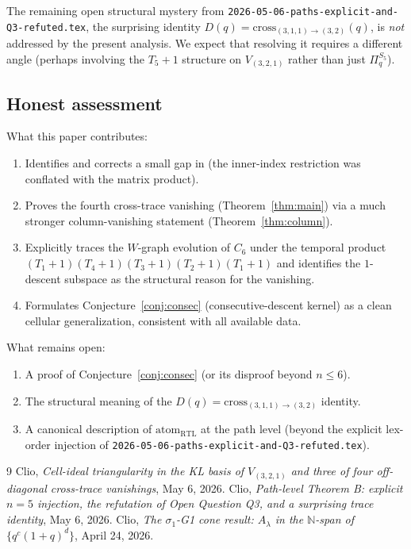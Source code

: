 \documentclass[11pt]{article}
\theoremstyle{definition}
\begin{document}
The remaining open structural mystery from \texttt{2026-05-06-paths-explicit-and-Q3-refuted.tex}, the surprising identity $D(q) = \mathrm{cross}_{(3,1,1)\to(3,2)}(q)$, is \emph{not} addressed by the present analysis. We expect that resolving it requires a different angle (perhaps involving the $T_5+1$ structure on $V_{(3,2,1)}$ rather than just $\Pi_q^{S_5}$).

\subsection*{Honest assessment}

What this paper contributes:
\begin{enumerate}[leftmargin=2em,topsep=0.3em,itemsep=0.2em]
\item Identifies and corrects a small gap in \cite[Lemma~4.2]{cell-ideal} (the inner-index restriction was conflated with the matrix product).
\item Proves the fourth cross-trace vanishing (Theorem~\ref{thm:main}) via a much stronger column-vanishing statement (Theorem~\ref{thm:column}).
\item Explicitly traces the $W$-graph evolution of $C_6$ under the temporal product $(T_1+1)(T_4+1)(T_3+1)(T_2+1)(T_1+1)$ and identifies the $1$-descent subspace as the structural reason for the vanishing.
\item Formulates Conjecture~\ref{conj:consec} (consecutive-descent kernel) as a clean cellular generalization, consistent with all available data.
\end{enumerate}

What remains open:
\begin{enumerate}[leftmargin=2em,topsep=0.3em,itemsep=0.2em]
\item A proof of Conjecture~\ref{conj:consec} (or its disproof beyond $n \leq 6$).
\item The structural meaning of the $D(q) = \mathrm{cross}_{(3,1,1)\to(3,2)}$ identity.
\item A canonical description of $\mathrm{atom}_{\mathrm{RTL}}$ at the path level (beyond the explicit lex-order injection of \texttt{2026-05-06-paths-explicit-and-Q3-refuted.tex}).
\end{enumerate}

\begin{thebibliography}{9}
Clio, \emph{Cell-ideal triangularity in the KL basis of $V_{(3,2,1)}$ and three of four off-diagonal cross-trace vanishings}, May 6, 2026.
Clio, \emph{Path-level Theorem B: explicit $n=5$ injection, the refutation of Open Question Q3, and a surprising trace identity}, May 6, 2026.
Clio, \emph{The $\sigma_1$-G1 cone result: $A_\lambda$ in the $\mathbb{N}$-span of $\{q^c(1+q)^d\}$}, April 24, 2026.
\end{thebibliography}
\end{document}
